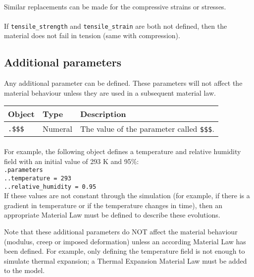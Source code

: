 \documentclass[10pt]{article}
\begin{document}
\paragraph{} Similar replacements can be made for the compressive strains or stresses.

\paragraph{} If \verb+tensile_strength+ and \verb+tensile_strain+ are both not defined, then the material does not fail in tension (same with compression).


\subsection{Additional parameters}

Any additional parameter can be defined. These parameters will not affect the material behaviour unless they are used in a subsequent material law.\\

\begin{tabularx}{\textwidth}{llX}
\hline 
Object & Type & Description \\ 
\hline 
\verb+.$$$+ & Numeral & The value of the parameter called \verb+$$$+.\\
\hline 
\end{tabularx}

\paragraph{} For example, the following object defines a temperature and relative humidity field with an initial value of 293 K and 95\%:\\
\verb+.parameters+\\
\verb+..temperature = 293+\\
\verb+..relative_humidity = 0.95+\\

If these values are not constant through the simulation (for example, if there is a gradient in temperature or if the temperature changes in time), then an appropriate Material Law must be defined to describe these evolutions.

Note that these additional parameters do NOT affect the material behaviour (modulus, creep or imposed deformation) unless an according Material Law has been defined. For example, only defining the temperature field is not enough to simulate thermal expansion; a Thermal Expansion Material Law must be added to the model.
\end{document}
